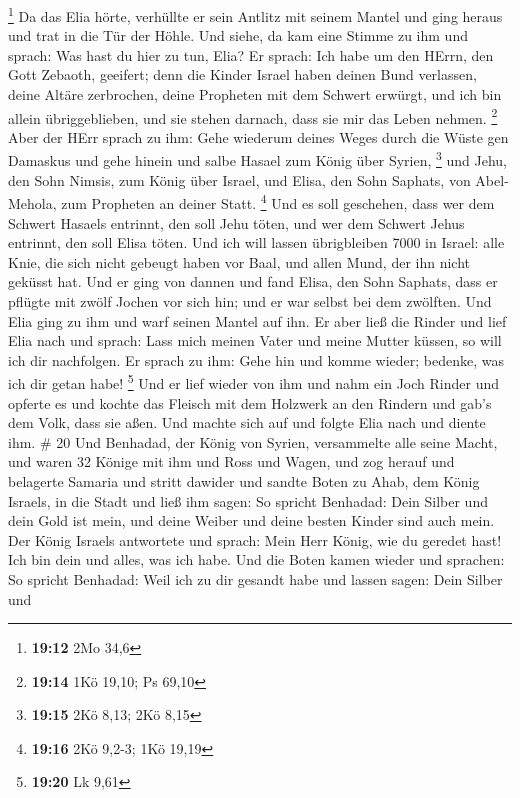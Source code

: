 \footnote{\textbf{19:12} 2Mo 34,6}  Da das Elia hörte,
verhüllte er sein Antlitz mit seinem Mantel und ging heraus und trat in
die Tür der Höhle. Und siehe, da kam eine Stimme zu ihm und sprach: Was
hast du hier zu tun, Elia?  Er sprach: Ich habe um den
HErrn, den Gott Zebaoth, geeifert; denn die Kinder Israel haben deinen
Bund verlassen, deine Altäre zerbrochen, deine Propheten mit dem Schwert
erwürgt, und ich bin allein übriggeblieben, und sie stehen darnach, dass
sie mir das Leben nehmen. \footnote{\textbf{19:14} 1Kö 19,10; Ps 69,10}
 Aber der HErr sprach zu ihm: Gehe wiederum deines Weges
durch die Wüste gen Damaskus und gehe hinein und salbe Hasael zum König
über Syrien, \footnote{\textbf{19:15} 2Kö 8,13; 2Kö 8,15} 
und Jehu, den Sohn Nimsis, zum König über Israel, und Elisa, den Sohn
Saphats, von Abel-Mehola, zum Propheten an deiner Statt. \footnote{\textbf{19:16}
  2Kö 9,2-3; 1Kö 19,19}  Und es soll geschehen, dass wer
dem Schwert Hasaels entrinnt, den soll Jehu töten, und wer dem Schwert
Jehus entrinnt, den soll Elisa töten.  Und ich will lassen
übrigbleiben 7000 in Israel: alle Knie, die sich nicht gebeugt haben vor
Baal, und allen Mund, der ihn nicht geküsst hat.  Und er
ging von dannen und fand Elisa, den Sohn Saphats, dass er pflügte mit
zwölf Jochen vor sich hin; und er war selbst bei dem zwölften. Und Elia
ging zu ihm und warf seinen Mantel auf ihn.  Er aber ließ
die Rinder und lief Elia nach und sprach: Lass mich meinen Vater und
meine Mutter küssen, so will ich dir nachfolgen. Er sprach zu ihm: Gehe
hin und komme wieder; bedenke, was ich dir getan habe! \footnote{\textbf{19:20}
  Lk 9,61}  Und er lief wieder von ihm und nahm ein Joch
Rinder und opferte es und kochte das Fleisch mit dem Holzwerk an den
Rindern und gab's dem Volk, dass sie aßen. Und machte sich auf und
folgte Elia nach und diente ihm. \# 20  Und Benhadad, der
König von Syrien, versammelte alle seine Macht, und waren 32 Könige mit
ihm und Ross und Wagen, und zog herauf und belagerte Samaria und stritt
dawider  und sandte Boten zu Ahab, dem König Israels, in die
Stadt  und ließ ihm sagen: So spricht Benhadad: Dein Silber
und dein Gold ist mein, und deine Weiber und deine besten Kinder sind
auch mein.  Der König Israels antwortete und sprach: Mein
Herr König, wie du geredet hast! Ich bin dein und alles, was ich habe.
 Und die Boten kamen wieder und sprachen: So spricht
Benhadad: Weil ich zu dir gesandt habe und lassen sagen: Dein Silber und
